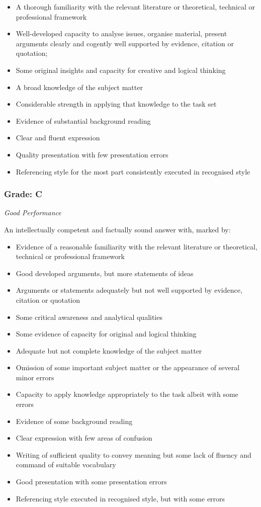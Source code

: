 \begin{itemize}
	\item A thorough familiarity with the relevant literature or theoretical, technical or professional framework
	\item Well-developed capacity to analyse issues, organise material, present arguments clearly and cogently well supported by evidence, citation or quotation;
	\item Some original insights and capacity for creative and logical thinking
	\item A broad knowledge of the subject matter
	\item Considerable strength in applying that knowledge to the task set
	\item Evidence of substantial background reading
	\item Clear and fluent expression
	\item Quality presentation with few presentation errors
	\item Referencing style for the most part consistently executed in recognised style
\end{itemize}


\subsubsection*{Grade: C}

\textit{Good Performance}

An intellectually competent and factually sound answer with, marked by:

\begin{itemize}
	\item Evidence of a reasonable familiarity with the relevant literature or theoretical, technical or professional framework
	\item Good developed arguments, but more statements of ideas
	\item Arguments or statements adequately but not well supported by evidence, citation or quotation
	\item Some critical awareness and analytical qualities
	\item Some evidence of capacity for original and logical thinking
	\item Adequate but not complete
	knowledge of the subject matter
	\item Omission of some important subject matter or the appearance of several minor errors
	\item Capacity to apply knowledge appropriately to the task albeit with some errors
	\item Evidence of some background reading
	\item Clear expression with few areas of confusion
	\item Writing of sufficient quality to convey meaning but some lack of fluency and command of suitable vocabulary
	\item Good presentation with some presentation errors
	\item Referencing style executed in recognised style, but with some errors
\end{itemize}


